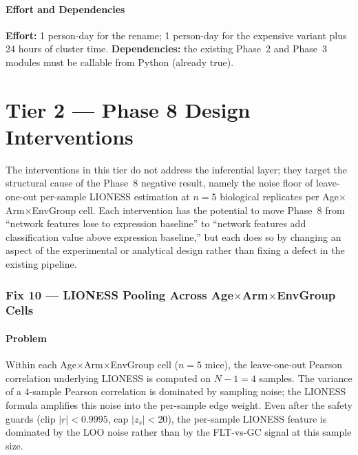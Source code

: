 \documentclass[11pt]{article}
\begin{document}
\subsection{Effort and Dependencies}

\textbf{Effort:} 1 person-day for the rename; 1 person-day for the expensive variant plus 24 hours of cluster time. \textbf{Dependencies:} the existing Phase~2 and Phase~3 modules must be callable from Python (already true).

\clearpage

\part*{Tier 2 — Phase 8 Design Interventions}

\noindent The interventions in this tier do not address the inferential layer; they target the structural cause of the Phase~8 negative result, namely the noise floor of leave-one-out per-sample LIONESS estimation at $n{=}5$ biological replicates per Age$\times$Arm$\times$EnvGroup cell. Each intervention has the potential to move Phase~8 from ``network features lose to expression baseline'' to ``network features add classification value above expression baseline,'' but each does so by changing an aspect of the experimental or analytical design rather than fixing a defect in the existing pipeline.

\section{Fix 10 --- LIONESS Pooling Across Age$\times$Arm$\times$EnvGroup Cells}

\subsection{Problem}

Within each Age$\times$Arm$\times$EnvGroup cell ($n{=}5$ mice), the leave-one-out Pearson correlation underlying LIONESS is computed on $N{-}1{=}4$ samples. The variance of a 4-sample Pearson correlation is dominated by sampling noise; the LIONESS formula amplifies this noise into the per-sample edge weight. Even after the safety guards (clip $|r|<0.9995$, cap $|z_s|<20$), the per-sample LIONESS feature is dominated by the LOO noise rather than by the FLT-vs-GC signal at this sample size.
\end{document}
